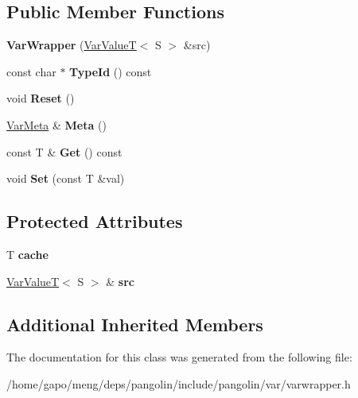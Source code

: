 \subsection*{Public Member Functions}
\begin{DoxyCompactItemize}
\item 
{\bfseries Var\+Wrapper} (\hyperlink{classpangolin_1_1_var_value_t}{Var\+ValueT}$<$ S $>$ \&src)\hypertarget{classpangolin_1_1_var_wrapper_acc67e605f0f1636d3f4592739059f543}{}\label{classpangolin_1_1_var_wrapper_acc67e605f0f1636d3f4592739059f543}

\item 
const char $\ast$ {\bfseries Type\+Id} () const \hypertarget{classpangolin_1_1_var_wrapper_a2ba93d58ced52919381341a97fcd384e}{}\label{classpangolin_1_1_var_wrapper_a2ba93d58ced52919381341a97fcd384e}

\item 
void {\bfseries Reset} ()\hypertarget{classpangolin_1_1_var_wrapper_a1910e3c12aef8d27c81f4110db2a4071}{}\label{classpangolin_1_1_var_wrapper_a1910e3c12aef8d27c81f4110db2a4071}

\item 
\hyperlink{structpangolin_1_1_var_meta}{Var\+Meta} \& {\bfseries Meta} ()\hypertarget{classpangolin_1_1_var_wrapper_af10006f6e208f67ee489d4907cfb07ef}{}\label{classpangolin_1_1_var_wrapper_af10006f6e208f67ee489d4907cfb07ef}

\item 
const T \& {\bfseries Get} () const \hypertarget{classpangolin_1_1_var_wrapper_a7cf7886679cd50a016e694583cc9df5c}{}\label{classpangolin_1_1_var_wrapper_a7cf7886679cd50a016e694583cc9df5c}

\item 
void {\bfseries Set} (const T \&val)\hypertarget{classpangolin_1_1_var_wrapper_ad774af247e74a29b3850c75ea702b817}{}\label{classpangolin_1_1_var_wrapper_ad774af247e74a29b3850c75ea702b817}

\end{DoxyCompactItemize}
\subsection*{Protected Attributes}
\begin{DoxyCompactItemize}
\item 
T {\bfseries cache}\hypertarget{classpangolin_1_1_var_wrapper_ab8dad5f4f0fb9e28663f4902dd777623}{}\label{classpangolin_1_1_var_wrapper_ab8dad5f4f0fb9e28663f4902dd777623}

\item 
\hyperlink{classpangolin_1_1_var_value_t}{Var\+ValueT}$<$ S $>$ \& {\bfseries src}\hypertarget{classpangolin_1_1_var_wrapper_a9a2c31b25f95bac618eda2f65fa1d197}{}\label{classpangolin_1_1_var_wrapper_a9a2c31b25f95bac618eda2f65fa1d197}

\end{DoxyCompactItemize}
\subsection*{Additional Inherited Members}


The documentation for this class was generated from the following file\+:\begin{DoxyCompactItemize}
\item 
/home/gapo/meng/deps/pangolin/include/pangolin/var/varwrapper.\+h\end{DoxyCompactItemize}

